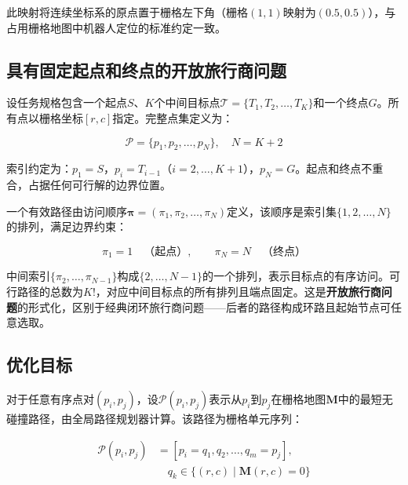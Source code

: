 \documentclass[lettersize,journal]{IEEEtran}
\begin{document}
此映射将连续坐标系的原点置于栅格左下角（栅格$(1,1)$映射为$(0.5, 0.5)$），与占用栅格地图中机器人定位的标准约定一致。

\subsection{具有固定起点和终点的开放旅行商问题}

\label{subsec:otspp}

设任务规格包含一个起点$S$、$K$个中间目标点$\mathcal{T} = \{T_1, T_2, \dots, T_K\}$和一个终点$G$。所有点以栅格坐标$[r, c]$指定。完整点集定义为：

\begin{equation}
\mathcal{P} = \{p_1, p_2, \dots, p_N\}, \quad N = K + 2
\label{eq:pset}
\end{equation}

索引约定为：$p_1 = S$，$p_i = T_{i-1}$（$i = 2, \dots, K+1$），$p_N = G$。起点和终点不重合，占据任何可行解的边界位置。

一个有效路径由访问顺序$\bm{\pi} = (\pi_1, \pi_2, \dots, \pi_N)$定义，该顺序是索引集$\{1, 2, \dots, N\}$的排列，满足边界约束：

\begin{equation}
\pi_1 = 1 \quad \text{（起点）}, \qquad \pi_N = N \quad \text{（终点）}
\label{eq:boundary}
\end{equation}

中间索引$\{\pi_2, \dots, \pi_{N-1}\}$构成$\{2, \dots, N-1\}$的一个排列，表示目标点的有序访问。可行路径的总数为$K!$，对应中间目标点的所有排列且端点固定。这是\textbf{开放旅行商问题}的形式化，区别于经典闭环旅行商问题——后者的路径构成环路且起始节点可任意选取\cite{ref3,ref4}。

\subsection{优化目标}

对于任意有序点对$(p_i, p_j)$，设$\mathcal{P}(p_i, p_j)$表示从$p_i$到$p_j$在栅格地图$\mathbf{M}$中的最短无碰撞路径，由全局路径规划器计算。该路径为栅格单元序列：

\begin{equation}
\begin{split}
\mathcal{P}(p_i, p_j) &= [p_i = q_1, q_2, \dots, q_m = p_j],\\
&\quad q_k \in \{(r, c) \mid \mathbf{M}(r, c) = 0\}
\end{split}
\label{eq:pathseq}
\end{equation}
\end{document}
